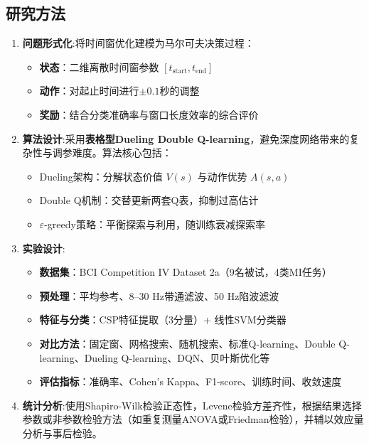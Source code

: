 \documentclass[12pt,a4paper]{ctexart}
\begin{document}
\subsection*{研究方法}
\begin{enumerate}
    \item \textbf{问题形式化}:将时间窗优化建模为马尔可夫决策过程：
            \begin{itemize}
                \item \textbf{状态}：二维离散时间窗参数 \([t_{\text{start}}, t_{\text{end}}]\)
                \item \textbf{动作}：对起止时间进行\(\pm 0.1\)秒的调整
                \item \textbf{奖励}：结合分类准确率与窗口长度效率的综合评价
            \end{itemize}
    \item \textbf{算法设计}:采用\textbf{表格型Dueling Double Q-learning}，避免深度网络带来的复杂性与调参难度。算法核心包括：
            \begin{itemize}
                \item Dueling架构：分解状态价值 \(V(s)\) 与动作优势 \(A(s,a)\)
                \item Double Q机制：交替更新两套Q表，抑制过高估计
                \item \(\varepsilon\)-greedy策略：平衡探索与利用，随训练衰减探索率
            \end{itemize}
    \item \textbf{实验设计}:
            \begin{itemize}
                \item \textbf{数据集}：BCI Competition IV Dataset 2a（9名被试，4类MI任务）
                \item \textbf{预处理}：平均参考、8--30 Hz带通滤波、50 Hz陷波滤波
                \item \textbf{特征与分类}：CSP特征提取（3分量）+ 线性SVM分类器
                \item \textbf{对比方法}：固定窗、网格搜索、随机搜索、标准Q-learning、Double Q-learning、Dueling Q-learning、DQN、贝叶斯优化等
                \item \textbf{评估指标}：准确率、Cohen's Kappa、F1-score、训练时间、收敛速度
            \end{itemize}
    \item \textbf{统计分析}:使用Shapiro-Wilk检验正态性，Levene检验方差齐性，根据结果选择参数或非参数检验方法（如重复测量ANOVA或Friedman检验），并辅以效应量分析与事后检验。

\end{enumerate}
\end{document}
